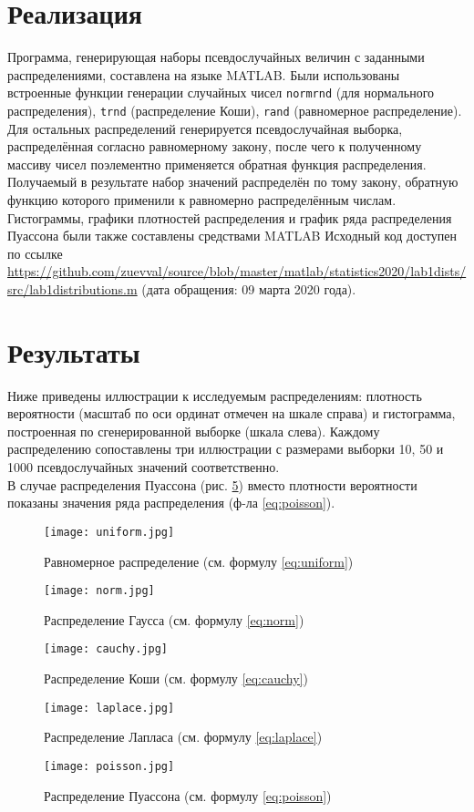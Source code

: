 \documentclass[report1.tex]{subfiles}
\begin{document}
\newpage
\section{Реализация}
Программа, генерирующая наборы псевдослучайных величин с заданными распределениями, составлена на языке MATLAB\textsuperscript{\textregistered}. Были использованы встроенные функции генерации случайных чисел \texttt{normrnd} (для нормального распределения), \texttt{trnd} (распределение Коши), \texttt{rand} (равномерное распределение).\\
Для остальных распределений генерируется псевдослучайная выборка, распределённая согласно равномерному закону, после чего к полученному массиву чисел поэлементно применяется обратная функция распределения. Получаемый в результате набор значений распределён по тому закону, обратную функцию которого применили к равномерно распределённым числам.\\
Гистограммы, графики плотностей распределения и график ряда распределения Пуассона были также составлены средствами MATLAB\textsuperscript{\textregistered} Исходный код доступен по ссылке \url{https://github.com/zuevval/source/blob/master/matlab/statistics2020/lab1dists/src/lab1distributions.m} (дата обращения: 09 марта 2020 года).

\newpage
\section{Результаты}
Ниже приведены иллюстрации к исследуемым распределениям: плотность вероятности (масштаб по оси ординат отмечен на шкале справа) и гистограмма, построенная по сгенерированной выборке (шкала слева). Каждому распределению сопоставлены три иллюстрации с размерами выборки 10, 50 и 1000 псевдослучайных значений соответственно.\\
В случае распределения Пуассона (рис. \ref{poissonPict}) вместо плотности вероятности показаны значения ряда распределения (ф-ла \ref{eq:poisson}).
\begin{figure}[H]
	\centering \texttt{[image: uniform.jpg]}
	\caption{Равномерное распределение (см. формулу \ref{eq:uniform})}
	\label{uniformDistPict}
\end{figure}
\begin{figure}[H]
	\centering \texttt{[image: norm.jpg]}
	\caption{Распределение Гаусса  (см. формулу \ref{eq:norm})}
	\label{gaussPict}
\end{figure}
\begin{figure}[H]
	\centering \texttt{[image: cauchy.jpg]}
	\caption{Распределение Коши (см. формулу \ref{eq:cauchy})}
	\label{cauchyPict}
\end{figure}
\begin{figure}[H]
	\centering \texttt{[image: laplace.jpg]}
	\caption{Распределение Лапласа (см. формулу \ref{eq:laplace})}
	\label{laplacePict}
\end{figure}
\begin{figure}[H]
	\centering \texttt{[image: poisson.jpg]}
	\caption{Распределение Пуассона (см. формулу \ref{eq:poisson})}
	\label{poissonPict}
\end{figure}
\end{document}
